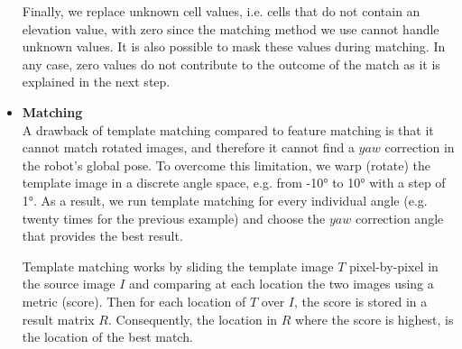 \begin{itemize}

        Finally, we replace unknown cell values, i.e. cells that do not
        contain an elevation value, with zero since the matching
        method we use cannot handle unknown values. It is also possible
        to mask these values during matching. In any case, zero values
        do not contribute to the outcome of the match as it is explained
        in the next step.

    \item \textbf{Matching} \\
        A drawback of template matching compared to feature matching is that it
        cannot match rotated images, and therefore it cannot find a
        $yaw$ correction in the robot's global pose.
        To overcome this limitation, we warp (rotate) the template image
        in a discrete angle space, e.g. from \ang{-10} to \ang{10} with
        a step of \ang{1}. As a result, we run template matching for every
        individual angle (e.g. twenty times for the previous example) and
        choose the $yaw$ correction angle that provides the best result.

        Template matching works by sliding the template image $T$
        pixel-by-pixel in the source image $I$ and comparing at each
        location the two images using a metric (score).
        Then for each location of $T$ over $I$, the score is stored in a
        result matrix $R$.
        Consequently, the location in $R$ where the score is highest,
        is the location of the best match.



\end{itemize}
